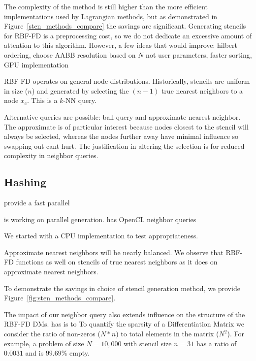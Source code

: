 \documentclass{report}
\begin{document}
The complexity of the method is still higher than the more efficient implementations used by Lagrangian methods, but as demonstrated in Figure~\ref{sten_methods_compare} the savings are significant. Generating stencils for RBF-FD is a preprocessing cost, so we do not dedicate an excessive amount of attention to this algorithm. However, a few ideas that would improve: hilbert ordering, choose AABB resolution based on $N$ not user parameters, faster sorting, GPU implementation



RBF-FD operates on general node distributions. Historically, stencils are uniform in size ($n$) and generated by selecting the $(n-1)$ true nearest neighbors to a node $x_c$. This is a $k$-NN query. 

Alternative queries are possible: ball query and approximate nearest neighbor. The approximate is of particular interest because nodes closest to the stencil will always be selected, whereas the nodes further away have minimal influence so swapping out cant hurt. The justification in altering the selection is for reduced complexity in neighbor queries.  




\subsection{Hashing}

\cite{Connor2009} provide a fast parallel 

\cite{Henke2012} is working on parallel generation. \cite{IanJohnsonThesis} has OpenCL neighbor queries

We started with a CPU implementation to test appropriateness. 

Approximate nearest neighbors will be nearly balanced. 
We observe that RBF-FD functions as well on stencils of true nearest neighbors as it does on approximate nearest neighbors.

To demonstrate the savings in choice of stencil generation method, we provide Figure~\ref{fig:sten_methods_compare}. 
 

The impact of our neighbor query also extends influence on the structure of the RBF-FD DMs.
has is to To quantify the sparsity of a Differentiation Matrix we consider the ratio of non-zeros ($N*n$) to total elements in the matrix ($N^2$). For example, a problem of size $N = 10,000$ with stencil size $n=31$ has a ratio of $0.0031$ and is $99.69\%$ empty. 
\end{document}
